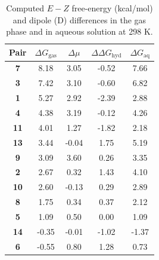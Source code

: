 \documentclass[12pt]{report}
\begin{document}
\vspace*{0.5cm}
\begin{table}[ht]
\centering
\caption{Computed $E-Z$ free-energy (kcal/mol) and dipole (D) differences in the gas phase and in aqueous solution at 298 K.}
\begin{tabular}{cSSSS}
\toprule
Pair                    & {$\Delta G_{\textrm{gas}}$} & {$\Delta\mu$} & {$\Delta\Delta G_{\textrm{hyd}}$} & {$\Delta G_{\textrm{aq}}$}\\
\midrule
\textbf{7}                  & 8.18                      & 3.05         &  -0.52                          & 7.66       \\
\textbf{3}                  & 7.42                      & 3.10         &  -0.60                          & 6.82       \\
\textbf{1}                  & 5.27                      & 2.92         &  -2.39                          & 2.88       \\
\textbf{4}                  & 4.38                      & 3.19         &  -0.12                          & 4.26       \\
\textbf{11}                 & 4.01                      & 1.27         &  -1.82                          & 2.18       \\
\textbf{13}                 & 3.44                      &  -0.04       & 1.75                            & 5.19       \\
\textbf{9}                  & 3.09                      & 3.60         & 0.26                            & 3.35       \\
\textbf{2}                  & 2.67                      & 0.32         & 1.43                            & 4.10       \\
\textbf{10}                 & 2.60                      &  -0.13       & 0.29                            & 2.89       \\
\textbf{8}                  & 1.75                      & 0.34         & 0.37                            & 2.12       \\
\textbf{5}                  & 1.09                      & 0.50         & 0.00                            & 1.09       \\
\textbf{14}                 &  -0.35                    &  -0.01       &  -1.02                          &  -1.37     \\
\textbf{6}                  &  -0.55                    & 0.80         & 1.28                            & 0.73       \\

\end{tabular}
\end{table}
\end{document}
